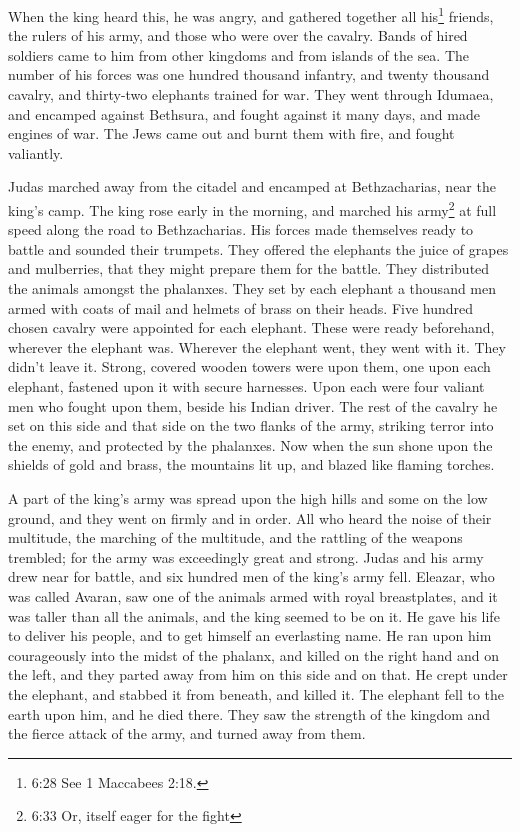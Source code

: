  When the king heard this, he was angry, and gathered
together all his\footnote{6:28 See 1 Maccabees 2:18.} friends, the
rulers of his army, and those who were over the cavalry. 
Bands of hired soldiers came to him from other kingdoms and from islands
of the sea.  The number of his forces was one hundred
thousand infantry, and twenty thousand cavalry, and thirty-two elephants
trained for war.  They went through Idumaea, and encamped
against Bethsura, and fought against it many days, and made engines of
war. The Jews came out and burnt them with fire, and fought valiantly.

 Judas marched away from the citadel and encamped at
Bethzacharias, near the king's camp.  The king rose early
in the morning, and marched his army\footnote{6:33 Or, itself eager for
  the fight} at full speed along the road to Bethzacharias. His forces
made themselves ready to battle and sounded their trumpets.
 They offered the elephants the juice of grapes and
mulberries, that they might prepare them for the battle. 
They distributed the animals amongst the phalanxes. They set by each
elephant a thousand men armed with coats of mail and helmets of brass on
their heads. Five hundred chosen cavalry were appointed for each
elephant.  These were ready beforehand, wherever the
elephant was. Wherever the elephant went, they went with it. They didn't
leave it.  Strong, covered wooden towers were upon them,
one upon each elephant, fastened upon it with secure harnesses. Upon
each were four valiant men who fought upon them, beside his Indian
driver.  The rest of the cavalry he set on this side and
that side on the two flanks of the army, striking terror into the enemy,
and protected by the phalanxes.  Now when the sun shone
upon the shields of gold and brass, the mountains lit up, and blazed
like flaming torches.

 A part of the king's army was spread upon the high hills
and some on the low ground, and they went on firmly and in order.
 All who heard the noise of their multitude, the marching
of the multitude, and the rattling of the weapons trembled; for the army
was exceedingly great and strong.  Judas and his army drew
near for battle, and six hundred men of the king's army fell.
 Eleazar, who was called Avaran, saw one of the animals
armed with royal breastplates, and it was taller than all the animals,
and the king seemed to be on it.  He gave his life to
deliver his people, and to get himself an everlasting name.
 He ran upon him courageously into the midst of the
phalanx, and killed on the right hand and on the left, and they parted
away from him on this side and on that.  He crept under the
elephant, and stabbed it from beneath, and killed it. The elephant fell
to the earth upon him, and he died there.  They saw the
strength of the kingdom and the fierce attack of the army, and turned
away from them.

